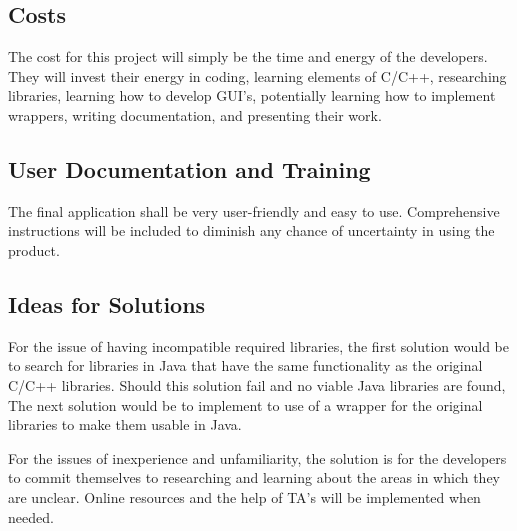 \documentclass{article}
\begin{document}
\subsection{Costs}
\indent \indent The cost for this project will simply be the time and energy of the developers. They will invest their energy in coding, learning elements of C/C++, researching libraries, learning how to develop GUI's, potentially learning how to implement wrappers, writing documentation, and presenting their work.

\subsection{User Documentation and Training}
\indent \ident The final application shall be very user-friendly and easy to use. Comprehensive instructions will be included to diminish any chance of uncertainty in using the product.

\subsection{Ideas for Solutions}
\indent \indent For the issue of having incompatible required libraries, the first solution would be to search for libraries in Java that have the same functionality as the original C/C++ libraries. Should this solution fail and no viable Java libraries are found, The next solution would be to implement to use of a wrapper for the original libraries to make them usable in Java.

\indent For the issues of inexperience and unfamiliarity, the solution is for the developers to commit themselves to researching and learning about the areas in which they are unclear. Online resources and the help of TA's will be implemented when needed.
\end{document}
